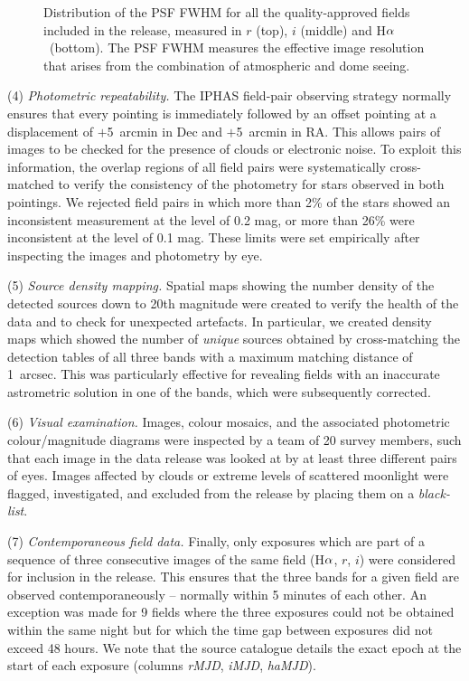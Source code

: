 \documentclass[useAMS,usenatbib]{mn2e}
\def\ha{\mbox{H$\rm \alpha$}}
\begin{document}
\begin{figure}
\begin{minipage}[b]{\linewidth}
    \end{minipage}
    \caption{Distribution of the PSF FWHM
             for all the quality-approved fields
             included in the release,
             measured in $r$ (top), $i$ (middle) and \ha\ (bottom).
             The PSF FWHM measures the effective image resolution
             that arises from the combination of atmospheric and dome seeing.}
    \label{fig:seeing}
\end{figure}


(4) \emph{Photometric repeatability.} 
The IPHAS field-pair observing strategy normally
ensures that every pointing is immediately followed 
by an offset pointing at a displacement
of $+$5~arcmin in Dec and $+$5~arcmin in RA.
This allows pairs of images to be checked 
for the presence of clouds or electronic noise.
To exploit this information,
the overlap regions of all field pairs were systematically cross-matched
to verify the consistency of the photometry
for stars observed in both pointings.
We rejected field pairs in which more than 2\% of the stars 
showed an inconsistent measurement at the level of 0.2 mag,
or more than 26\% were inconsistent at the level of 0.1 mag.
These limits were set empirically after inspecting
the images and photometry by eye.

(5) \emph{Source density mapping.}
Spatial maps showing the number density of the detected sources
down to 20th magnitude were created to verify the health
of the data and to check for unexpected artefacts.
In particular, we created density maps
which showed the number of \emph{unique} sources
obtained by cross-matching the detection tables of
all three bands with a maximum matching distance of 1~arcsec.
This was particularly effective for revealing
fields with an inaccurate astrometric solution in one of the bands,
which were subsequently corrected.

(6) \emph{Visual examination.}
Images, colour mosaics,
and the associated photometric colour/magnitude diagrams
were inspected by a team of 20 survey members, 
such that each image in the data release 
was looked at by at least three different pairs of eyes.
Images affected by clouds or extreme levels of scattered moonlight
were flagged, investigated,
and excluded from the release 
by placing them on a \emph{black-list}.

(7) \emph{Contemporaneous field data.} 
Finally, only exposures which are part of a sequence 
of three consecutive images of the same field
(\ha, $r$, $i$)
were considered for inclusion in the release. 
This ensures that the three bands for a given field
are observed contemporaneously --  
normally within 5 minutes of each other.
An exception was made for 9 fields where the three exposures 
could not be obtained within the same night
but for which the time gap between exposures did not exceed 48 hours.
We note that the source catalogue details the exact epoch
at the start of each exposure
(columns \emph{rMJD}, \emph{iMJD}, \emph{haMJD}).
\end{document}
